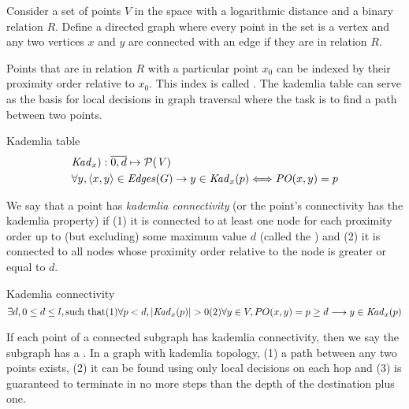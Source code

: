 Consider a set of points $V$ in the space with a logarithmic distance and 
a binary relation $R$. Define a directed graph where every point in the set is a vertex and any two vertices $x$ and $y$ are  connected with an edge if they are in relation $R$. 


Points that are in relation $R$ with a particular point $x_0$ can be indexed by their proximity order relative to $x_0$. This index is called .
The kademlia table can serve as the basis for local decisions in graph traversal where the task is to find a path between two points. 


\begin{definition}{Kademlia table}\label{def:kademlia-table}
\begin{equation}
\begin{split}
&\mathit{Kad}_x): \overline{0,d} \mapsto \mathcal{P}(\mathit{V})\\
&\forall y, \langle x, y \rangle \in \mathit{Edges}(G) \rightarrow y \in \mathit{Kad}_x(p) \Longleftrightarrow \mathit{PO}(x,y)=p 
\end{split}
\end{equation}
\end{definition}

We say that a point has \emph{kademlia connectivity} (or the point's connectivity has  the kademlia property) if (1) it is connected to at least one node for each proximity order up to (but excluding) some maximum value $d$ (called the ) and (2) it is connected to all nodes whose proximity order relative to the node is greater or equal to $d$.

\begin{definition}{Kademlia connectivity}\label{sec:kademlia-connectivity}
\begin{equation}
\exists d, 0\leq d \leq l, \text{such that}
\begin{subequations}
(1)\forall p<d, |\mathit{Kad}_x(p)|>0 \\
(2)\forall y\in V, PO(x,y)=p\geq d \longrightarrow y\in\mathit{Kad}_x(p) 
\end{subequations}
\end{equation}
\end{definition}


If each point of a connected subgraph has kademlia connectivity, then we say the subgraph has a . In a graph with kademlia topology, (1) a path between any two points exists, (2) it can be found using only local decisions on each hop and (3) is guaranteed to terminate in no more steps than the depth of the destination plus one. 

